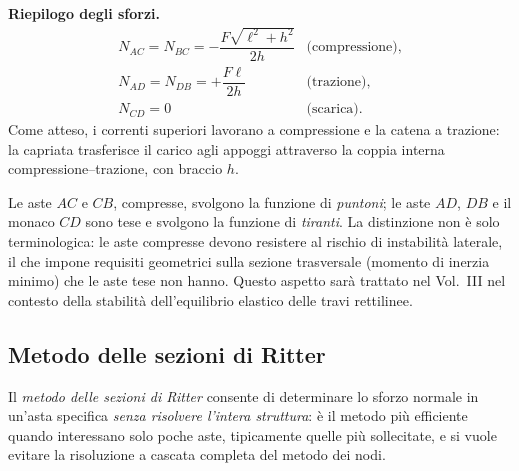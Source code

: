 \begin{esempio}
\begin{svolgimento}
		\noindent\textbf{Riepilogo degli sforzi.}
		\[
		\begin{array}{lll}
			N_{AC} = N_{BC} = -\dfrac{F\sqrt{\ell^2+h^2}}{2h}
			& \text{(compressione)}, \\[8pt]
			N_{AD} = N_{DB} = +\dfrac{F\ell}{2h}
			& \text{(trazione)}, \\[8pt]
			N_{CD} = 0
			& \text{(scarica)}.
		\end{array}
		\]
		Come atteso, i correnti superiori lavorano a
		compressione e la catena a trazione: la capriata
		trasferisce il carico agli appoggi attraverso
		la coppia interna compressione--trazione, con
		braccio $h$.
		\begin{oss}
			Le aste $AC$ e $CB$, compresse, svolgono la
			funzione di \emph{puntoni}; le aste $AD$, $DB$
			e il monaco $CD$ sono tese e svolgono la funzione
			di \emph{tiranti}. La distinzione non è solo
			terminologica: le aste compresse devono resistere
			al rischio di instabilità laterale, il che impone
			requisiti geometrici sulla sezione trasversale
			(momento di inerzia minimo) che le aste tese non
			hanno. Questo aspetto sarà trattato nel Vol.~III
			nel contesto della stabilità dell'equilibrio
			elastico delle travi rettilinee.
		\end{oss}
	\end{svolgimento}
\end{esempio}



\subsection{Metodo delle sezioni di Ritter}
\label{sec:metodo_ritter}

Il \emph{metodo delle sezioni di Ritter} consente
di determinare lo sforzo normale in un'asta specifica
\emph{senza risolvere l'intera struttura}: è il metodo
più efficiente quando interessano solo poche aste,
tipicamente quelle più sollecitate, e si vuole evitare
la risoluzione a cascata completa del metodo dei nodi.

